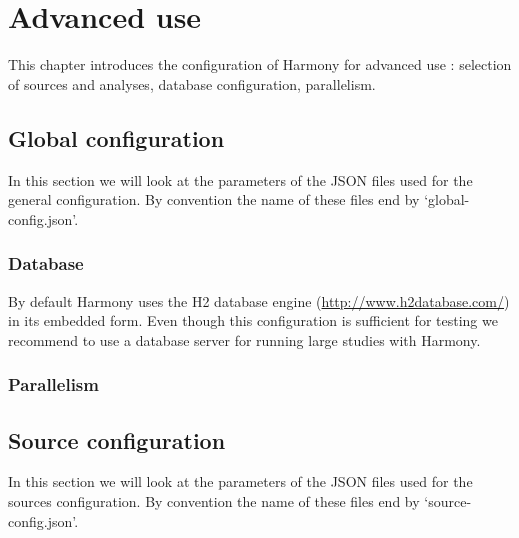 \chapter{Advanced use}

This chapter introduces the configuration of Harmony for advanced use : selection of sources and analyses, database configuration, parallelism.

	\section{Global configuration}
In this section we will look at the parameters of the JSON files used for the general configuration. By convention the name of these files end by `global-config.json'.



		\subsection{Database}
		By default Harmony uses the H2 database engine (\url{http://www.h2database.com/}) in its embedded form. Even though this configuration is sufficient for testing we recommend to use a database server for running large studies with Harmony.
		
		\subsection{Parallelism}
	
	\section{Source configuration}
In this section we will look at the parameters of the JSON files used for the sources configuration. By convention the name of these files end by `source-config.json'.
	
	
